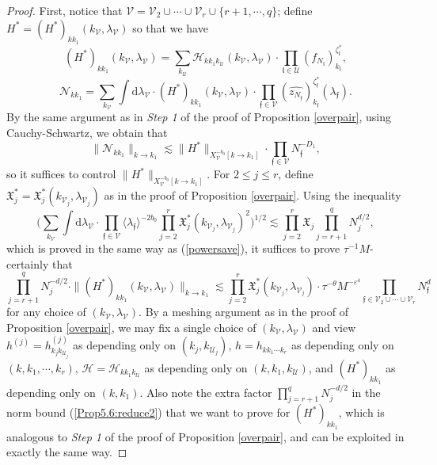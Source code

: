 \documentclass[11 pt,reqno]{amsart}
\theoremstyle{definition}
\theoremstyle{remark}
\numberwithin{equation}{section}
\newcommand{\Uc}{\mathcal{U}}
\newcommand{\Vc}{\mathcal{V}}
\newcommand{\Hc}{\mathcal{H}}
\newcommand{\ff}{\mathfrak{f}}
\newcommand{\Xf}{\mathfrak{X}}
\newcommand{\lf}{\mathfrak{l}}
\newcommand{\Ns}{\mathscr{N}}
\begin{document}
{\begin{proof}
First, notice that $\Vc=\Vc_2\cup\cdots\cup\Vc_r\cup\{r+1,\cdots,q\}$; define $H^*=(H^*)_{kk_1}(k_\Vc,\lambda_\Vc)$ so that we have
\begin{equation}\label{Prop5.6:defH*}(H^*)_{kk_1}(k_\Vc,\lambda_\Vc)=\sum_{k_\Uc}\Hc_{kk_1 k_\Uc}(k_\Vc,\lambda_\Vc)\cdot\prod_{\lf\in\Uc}(f_{N_\lf})_{k_\lf}^{\zeta_\lf^*},
\end{equation}
\begin{equation}\label{Prop5.6:forH*}\Ns_{kk_1}=\sum_{k_\Vc}\int\mathrm{d}\lambda_\Vc\cdot (H^*)_{kk_1}(k_\Vc,\lambda_\Vc)\cdot\prod_{\ff\in\Vc}(\widehat{z_{N_\ff}})_{k_\ff}^{\zeta_\ff^*}(\lambda_\ff).
\end{equation} By the same argument as in \emph{Step 1} of the proof of Proposition \ref{overpair}, using Cauchy-Schwartz, we obtain that
\begin{equation}\label{Prop5.6:reduce1}\|\Ns_{kk_1}\|_{k\to k_1}\lesssim\|H^*\|_{X_\Vc^{-b_0}[k\to k_1]}\cdot\prod_{\ff\in\Vc}N_\ff^{-D_1},
\end{equation}
 so it suffices to control $\|H^*\|_{X_\Vc^{-b_0}[k\to k_1]}$.  For $2\leq j\leq r$, define $\Xf_j^*=\Xf_j^*(k_{\Vc_j},\lambda_{\Vc_j})$ as in the proof of Proposition \ref{overpair}. Using the inequality
\begin{equation*}\bigg(\sum_{k_\Vc}\int\mathrm{d}\lambda_{\Vc}\cdot\prod_{\ff\in\Vc}\langle\lambda_\ff\rangle^{-2b_0}\prod_{j=2}^r\Xf_j^*(k_{\Vc_j},\lambda_{\Vc_j})^2\bigg)^{1/2}\lesssim\prod_{j=2}^r\Xf_j\prod_{j=r+1}^q N_j^{d/2},\end{equation*} which is proved in the same way as (\ref{powersave}), it suffices to prove $\tau^{-1}M$-certainly that
\begin{equation}\label{Prop5.6:reduce2}
\prod_{j=r+1}^qN_j^{-d/2}\cdot\|(H^*)_{kk_1}(k_\Vc,\lambda_\Vc)\|_{k\to k_1}\lesssim\prod_{j=2}^r\Xf_j^*(k_{\Vc_j},\lambda_{\Vc_j})\cdot\tau^{-\theta}M^{-\varepsilon^4}\prod_{\ff\in\Vc_2\cup\cdots\cup\Vc_r}N_\ff^d
\end{equation} for any choice of $(k_\Vc,\lambda_\Vc)$. By a meshing argument as in the proof of Proposition \ref{overpair}, we may fix a single choice of $(k_\Vc,\lambda_\Vc)$ and view $h^{(j)}=h_{k_jk_{\Uc_j}}^{(j)}$ as depending only on $(k_j,k_{\Uc_j})$, $h=h_{kk_1\cdots k_r}$ as depending only on $(k,k_1,\cdots,k_r)$, $\Hc=\Hc_{kk_1k_\Uc}$ as depending only on $(k,k_1,k_\Uc)$, and $(H^*)_{kk_1}$ as depending only on $(k,k_1)$. Also note the extra factor $\prod_{j=r+1}^qN_j^{-d/2}$ in the norm bound (\ref{Prop5.6:reduce2}) that we want to prove for $(H^*)_{kk_1}$, which is analogous to \emph{Step 1} of the proof of Proposition \ref{overpair}, and can be exploited in exactly the same way.


\end{proof}}
\end{document}
